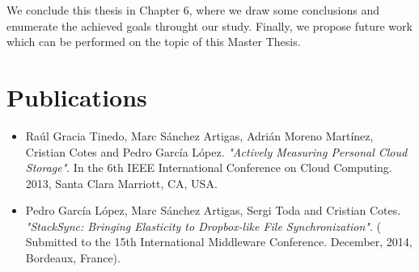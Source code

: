 We conclude this thesis in Chapter 6, where we draw some conclusions and enumerate the achieved goals throught our study. Finally, we propose future work which can be performed on the topic of this Master Thesis.

\section{Publications}

\begin{itemize}
\item Ra{\'u}l Gracia Tinedo, Marc S{\'a}nchez Artigas, Adri{\'a}n Moreno Mart{\'i}nez, Cristian Cotes and Pedro Garc{\'i}a L{\'o}pez. \textit{"Actively Measuring Personal Cloud Storage"}. In the 6th IEEE International Conference on Cloud Computing. 2013, Santa Clara Marriott, CA, USA.

\item Pedro Garc{\'i}a L{\'o}pez, Marc S{\'a}nchez Artigas, Sergi Toda and Cristian Cotes. \textit{"StackSync: Bringing Elasticity to Dropbox-like File Synchronization"}. ( Submitted to the 15th International Middleware Conference. December, 2014, Bordeaux, France).
\end{itemize}
